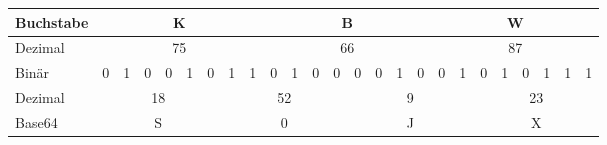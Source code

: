 \documentclass{standalone}
\begin{document}
\begin{tabular}{|l
                |c|c|c|c|c|c|c|c|c|c|c|c|c|c|c|c|c|c|c|c
                |c|c|c|c|}
                \hline
                Buchstabe&
                \multicolumn{8}{c|}{K}&
                \multicolumn{8}{c|}{B}&
                \multicolumn{8}{c|}{W}\\
                \hline
                Dezimal&
                \multicolumn{8}{c|}{75}&
                \multicolumn{8}{c|}{66}&
                \multicolumn{8}{c|}{87}\\
                \hline
                Binär&0&1&0&0&1&0&1&1&
                      0&1&0&0&0&0&1&0&
                      0&1&0&1&0&1&1&1\\
                \hline
                Dezimal&
                \multicolumn{6}{c|}{18}&
                \multicolumn{6}{c|}{52}&
                \multicolumn{6}{c|}{9}&
                \multicolumn{6}{c|}{23}\\
                \hline
                Base64&
                \multicolumn{6}{c|}{S}&
                \multicolumn{6}{c|}{0}&
                \multicolumn{6}{c|}{J}&
                \multicolumn{6}{c|}{X}\\
                \hline
\end{tabular}
\end{document}
